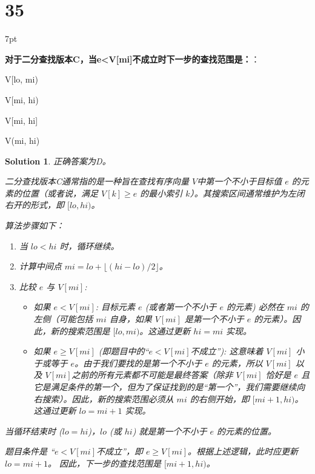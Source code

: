 \documentclass[UTF8]{report}
\newtheorem{solution}{Solution}
\theoremstyle{MyLineTheoremStyle} %
\theoremstyle{MyBlockTheoremStyle} %
\theoremstyle{MySubsubsectionStyle} %
\newenvironment{graybox}{%
        \def\FrameCommand{%
        \hspace{1pt}%
        {\color{gray}\small \vrule width 2pt}%
        {\color{graybox_color}\vrule width 4pt}%
        \colorbox{graybox_color}%
        }%
        \MakeFramed{\advance\hsize-\width\FrameRestore}%
        \noindent\hspace{-4.55pt}%
        \begin{adjustwidth}{}{7pt}%
        \vspace{2pt}\vspace{2pt}%
        }
        {%
        \vspace{2pt}\end{adjustwidth}\endMakeFramed%
        }
\begin{document}
\section*{35}

\begin{graybox}
\textbf{对于二分查找版本C，当e<V[mi]不成立时下一步的查找范围是：}：
\begin{circledenum}
    \item V[lo, mi)
    \item V[mi, hi)
    \item V[mi, hi]
    \item V(mi, hi)
\end{circledenum}
\end{graybox}

\begin{solution}
正确答案为D。

二分查找版本C通常指的是一种旨在查找有序向量 $V$中第一个不小于目标值 $e$ 的元素的位置（或者说，满足 $V[k] \ge e$ 的最小索引 $k$）。其搜索区间通常维护为左闭右开的形式，即 $[lo, hi)$。

算法步骤如下：
\begin{enumerate}
    \item 当 $lo < hi$ 时，循环继续。
    \item 计算中间点 $mi = lo + \lfloor (hi - lo) / 2 \rfloor$。
    \item 比较 $e$ 与 $V[mi]$:
    \begin{itemize}
        \item 如果 $e < V[mi]$: 目标元素 $e$ (或者第一个不小于 $e$ 的元素) 必然在 $mi$ 的左侧（可能包括 $mi$ 自身，如果 $V[mi]$ 是第一个不小于 $e$ 的元素）。因此，新的搜索范围是 $[lo, mi)$。这通过更新 $hi = mi$ 实现。
        \item 如果 $e \ge V[mi]$ (即题目中的“$e<V[mi]$不成立”): 这意味着 $V[mi]$ 小于或等于 $e$。由于我们要找的是第一个不小于 $e$ 的元素，所以 $V[mi]$ 以及 $V[mi]$之前的所有元素都不可能是最终答案（除非 $V[mi]$ 恰好是 $e$ 且它是满足条件的第一个，但为了保证找到的是“第一个”，我们需要继续向右搜索）。因此，新的搜索范围必须从 $mi$ 的右侧开始，即 $[mi+1, hi)$。这通过更新 $lo = mi + 1$ 实现。
    \end{itemize}
\end{enumerate}
当循环结束时 ($lo = hi$)，$lo$ (或 $hi$) 就是第一个不小于 $e$ 的元素的位置。

题目条件是 “$e<V[mi]$不成立”，即 $e \ge V[mi]$。根据上述逻辑，此时应更新 $lo = mi + 1$。
因此，下一步的查找范围是 $[mi+1, hi)$。


\end{solution}
\end{document}
